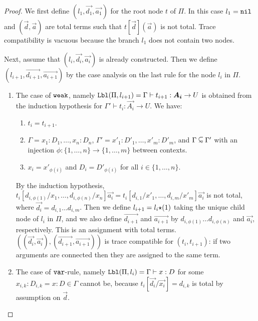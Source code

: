 \begin{proof}
  We first define $(l_1,\vec{d_1},\vec{a_1})$ for the root node $t$ of $\Pi$.
  In this case $l_1 = {\tt nil}$ 
   and $(\vec{d},\vec{a})$ are total terms such that $t[\vec{d}](\vec{a})$ is not total.
  Trace compatibility is vacuous because the branch $l_1$ does not contain two nodes.

  Next, assume that $(l_i,\vec{d_i},\vec{a_i})$ is already constructed.
  Then we define $(l_{i+1},\vec{d_{i+1}},\vec{a_{i+1}})$ by the case analysis on
  the last rule for the node $l_i$ in $\Pi$. 




\begin{enumerate}

\item
  The case of ${\tt weak}$, namely
  $\Label(\Pi,l_{i+1}) = \Gamma \vdash t_{i+1}:\vec{A_i}\rightarrow U$
  is obtained from the induction hypothesis for
  $\Gamma' \vdash t_{i}:\vec{A_i}\rightarrow U$. We have:

\begin{enumerate}
\item
 $t_i = t_{i+1}$. 
\item
  $\Gamma = x_1:D_1,\ldots,x_n:D_n$, $\Gamma' = x'_1:D'_1,\ldots,x'_m:D'_m$, and $\Gamma \subseteqsim \Gamma'$
  with an injection $\phi:\{1,\ldots,n\}\to\{1,\ldots,m\}$ between contexts. 
\item
  $x_i = x'_{\phi(i)}$ and $D_i = D'_{\phi(i)}$ for all $i \in \{1,\ldots,n\}$.
\end{enumerate}

  By the induction hypothesis, 
  $t_i[d_{i,\phi(1)}/x_1,\ldots,d_{i,\phi(n)}/x_n]\vec{a_i} 
   = t_i[d_{i,1}/x'_1,\ldots,d_{i,m}/x'_m]\vec{a_i}$ is not total,
  where $\vec{d_i} = d_{i,1}\ldots d_{i,m}$.
  Then we define $l_{i+1} = l_i{\star}(1)$ taking the unique child node of $l_i$ in $\Pi$, and we
  also define $\vec{d_{i+1}}$ and $\vec{a_{i+1}}$ by $d_{i,\phi(1)}\ldots d_{i,\phi(n)}$
  and $\vec{a_i}$, respectively. This is an assignment with total terms.
  $((\vec{d_i},\vec{a_i}),(\vec{d_{i+1}},\vec{a_{i+1}}))$
  is trace compatible for $(t_i,t_{i+1})$: if two arguments are connected then they are assigned
  to the same term. 

\item
  The case of ${\tt var}$-rule, namely ${\tt Lbl}(\Pi,l_i) = \Gamma\vdash x:D$ 
  for some $x_{i,k}:D_{i,k} = x:D \in \Gamma$
  cannot be, because $t_i [\vec{d_i}/\vec{x_i}] = d_{i,k}$ is total  by assumption on $\vec{d}$.
  

\end{enumerate}
\end{proof}
